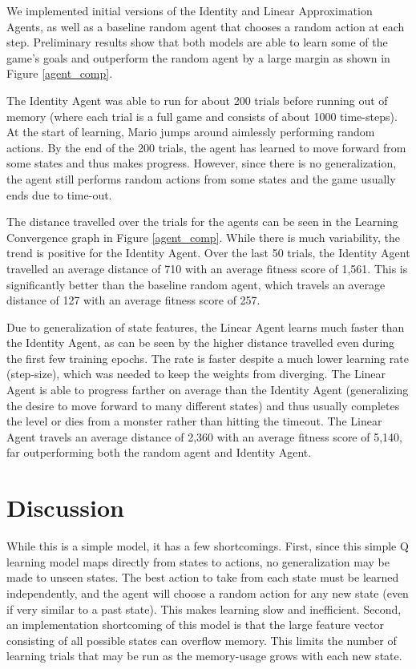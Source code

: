 \documentclass[12pt]{article}
\begin{document}
We implemented initial versions of the Identity and Linear Approximation Agents, as well as a baseline random agent that chooses a random action at each step. Preliminary results show that both models are able to learn some of the game's goals and outperform the random agent by a large margin as shown in Figure \ref{agent_comp}.

The Identity Agent was able to run for about 200 trials before running out of memory (where each trial is a full game and consists of about 1000 time-steps). At the start of learning, Mario jumps around aimlessly performing random actions. By the end of the 200 trials, the agent has learned to move forward from some states and thus makes progress. However, since there is no generalization, the agent still performs random actions from some states and the game usually ends due to time-out. 

The distance travelled over the trials for the agents can be seen in the Learning Convergence graph in Figure \ref{agent_comp}. While there is much variability, the trend is positive for the Identity Agent. Over the last 50 trials, the Identity Agent travelled an average distance of 710 with an average fitness score of 1,561. This is significantly better than the baseline random agent, which travels an average distance of 127 with an average fitness score of 257.

Due to generalization of state features, the Linear Agent learns much faster than the Identity Agent, as can be seen by the higher distance travelled even during the first few training epochs. The rate is faster despite a much lower learning rate (step-size), which was needed to keep the weights from diverging. The Linear Agent is able to progress farther on average than the Identity Agent (generalizing the desire to move forward to many different states) and thus usually completes the level or dies from a monster rather than hitting the timeout. The Linear Agent travels an average distance of 2,360 with an average fitness score of 5,140, far outperforming both the random agent and Identity Agent.

\section{Discussion}

While this is a simple model, it has a few shortcomings. First, since this simple Q learning model maps directly from states to actions, no generalization may be made to unseen states. The best action to take from each state must be learned independently, and the agent will choose a random action for any new state (even if very similar to a past state). This makes learning slow and inefficient. Second, an implementation shortcoming of this model is that the large feature vector consisting of all possible states can overflow memory. This limits the number of learning trials that may be run as the memory-usage grows with each new state.


\printbibliography
\end{document}
